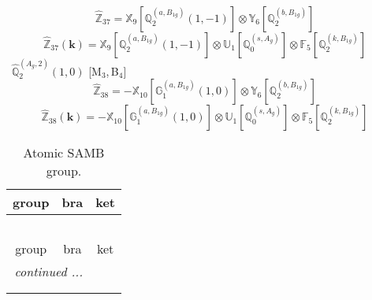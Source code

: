 \documentclass[fleqn,10pt,landscape]{article}
\begin{document}
\begin{itemize}
\begin{dmath*}
\hat{\mathbb{Z}}_{37}=\mathbb{X}_{9}[\mathbb{Q}_{2}^{(a,B_{1g})}(1,-1)] \otimes\mathbb{Y}_{6}[\mathbb{Q}_{2}^{(b,B_{1g})}]
\end{dmath*}
\begin{dmath*}
\hat{\mathbb{Z}}_{37}(\bm{k})=\mathbb{X}_{9}[\mathbb{Q}_{2}^{(a,B_{1g})}(1,-1)] \otimes\mathbb{U}_{1}[\mathbb{Q}_{0}^{(s,A_{g})}] \otimes\mathbb{F}_{5}[\mathbb{Q}_{2}^{(k,B_{1g})}]
\end{dmath*}
\vspace{4mm}
\noindent {} $\,\,\,\hat{\mathbb{Q}}_{2}^{(A_{g},2)}(1,0)$ [M$_{3}$,\,B$_{4}$]
\begin{dmath*}
\hat{\mathbb{Z}}_{38}=- \mathbb{X}_{10}[\mathbb{G}_{1}^{(a,B_{1g})}(1,0)] \otimes\mathbb{Y}_{6}[\mathbb{Q}_{2}^{(b,B_{1g})}]
\end{dmath*}
\begin{dmath*}
\hat{\mathbb{Z}}_{38}(\bm{k})=- \mathbb{X}_{10}[\mathbb{G}_{1}^{(a,B_{1g})}(1,0)] \otimes\mathbb{U}_{1}[\mathbb{Q}_{0}^{(s,A_{g})}] \otimes\mathbb{F}_{5}[\mathbb{Q}_{2}^{(k,B_{1g})}]
\end{dmath*}
\begin{center}
\renewcommand{\arraystretch}{1.3}
\begin{longtable}{c|c|c}
\caption{Atomic SAMB group.}
 \\
 \hline \hline
group & bra & ket \\ \hline \endfirsthead

\multicolumn{2}{l}{\tablename\ \thetable{}} \\
 \hline \hline
group & bra & ket \\ \hline \endhead

 \hline \hline
\multicolumn{2}{r}{\footnotesize\it continued ...} \\ \endfoot

 \hline \hline
\multicolumn{2}{r}{} \\ \endlastfoot


\end{longtable}
\end{center}
\end{itemize}
\end{document}
